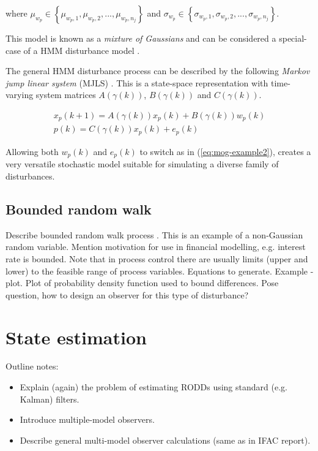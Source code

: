where $\mu_{w_p}\in\left\{\mu_{w_p,1},\mu_{w_p,2},...,\mu_{w_p,n_j}\right\}$ and $\sigma_{w_p}\in\left\{\sigma_{w_p,1},\sigma_{w_p,2},...,\sigma_{w_p,n_j}\right\}$.

This model is known as a \textit{mixture of Gaussians} and can be considered a special-case of a HMM disturbance model \citep{wong_disturbance_2007}.

The general HMM disturbance process can be described by the following \textit{Markov jump linear system} (MJLS) \citep{costa_discrete-time_2005}. This is a state-space representation with time-varying system matrices $A(\gamma(k))$, $B(\gamma(k))$ and $C(\gamma(k))$.

\begin{equation} \label{eq:HMM}
	\begin{split}
	x_p(k+1)= A(\gamma(k))x_p(k)+B(\gamma(k))w_p(k) \\
	p(k)=C(\gamma(k))x_p(k) + e_p(k)
	\end{split}
\end{equation}

Allowing both $w_p(k)$ and $e_p(k)$ to switch as in (\ref{eq:mog-example2}), creates a very versatile stochastic model suitable for simulating a diverse family of disturbances.

\subsection{Bounded random walk}

\begin{outline}
	\1 Describe bounded random walk process \citep{nicolau_stationary_2002}.
	\1 This is an example of a non-Gaussian random variable.
	\1 Mention motivation for use in financial modelling, e.g. interest rate is bounded.
	\1 Note that in process control there are usually limits (upper and lower) to the feasible range of process variables.
	\1 Equations to generate.
	\1 Example - plot.
	\1 Plot of probability density function used to bound differences.
	\1 Pose question, how to design an observer for this type of disturbance? 
\end{outline}

\section{State estimation}

Outline notes:
\begin{itemize}
	\item Explain (again) the problem of estimating RODDs using standard (e.g. Kalman) filters.
	\item Introduce multiple-model observers.
	\item Describe general multi-model observer calculations (same as in IFAC report).
\end{itemize}


